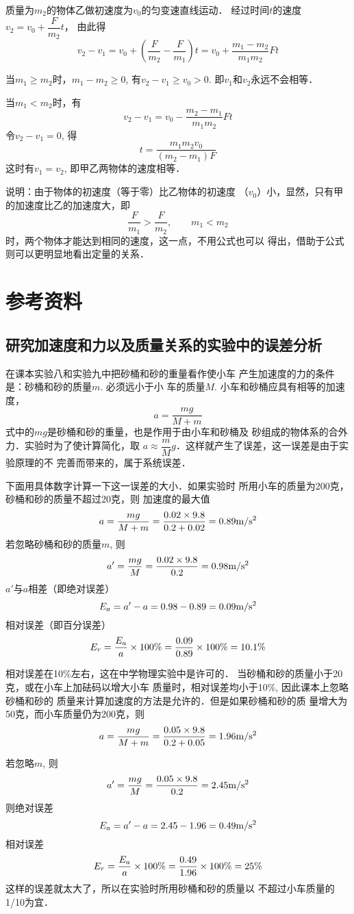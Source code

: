 \begin{enumerate}
\begin{solution}
质量为$m_2$的物体乙做初速度为$v_0$的匀变速直线运动．
经过时间$t$的速度$v_2=v_0+\dfrac{F}{m_2}t$，
由此得
\[v_2-v_1=v_0+\left(\dfrac{F}{m_2}-\dfrac{F}{m_1}\right)t=v_0+\frac{m_1-m_2}{m_1m_2}Ft\]

当$m_1\ge m_2$时，$m_1-m_2\ge 0$, 有$v_2-v_1\ge v_0>0$. 即$v_1$和$v_2$永远不会相等．

当$m_1<m_2$时，有
\[v_2-v_1=v_0-\frac{m_2-m_1}{m_1m_2}Ft\]
令$v_2-v_1=0$, 得
\[t=\frac{m_1m_2v_0}{(m_2-m_1)F}\]
这时有$v_1=v_2$, 即甲乙两物体的速度相等．

说明：由于物体的初速度（等于零）比乙物体的初速度
（$v_0$）小，显然，只有甲的加速度比乙的加速度大，即
\[\frac{F}{m_1}>\frac{F}{m_2},\qquad m_1<m_2\]
时，两个物体才能达到相同的速度，这一点，不用公式也可以
得出，借助于公式则可以更明显地看出定量的关系．
\end{solution}
\end{enumerate}

\section{参考资料}
\subsection{研究加速度和力以及质量关系的实验中的误差分析}

在课本实验八和实验九中把砂桶和砂的重量看作使小车
产生加速度的力的条件是：砂桶和砂的质量$m$. 必须远小于小
车的质量$M$. 小车和砂桶应具有相等的加速度，
\[a=\frac{mg}{M+m}\]
式中的$mg$是砂桶和砂的重量，也是作用于由小车和砂桶及
砂组成的物体系的合外力．实验时为了使计算简化，取
$a\approx \dfrac{m}{M}g$．这样就产生了误差，这一误差是由于实验原理的不
完善而带来的，属于系统误差．

下面用具体数字计算一下这一误差的大小．如果实验时
所用小车的质量为200克，砂桶和砂的质量不超过20克，则
加速度的最大值
\[a=\frac{mg}{M+m}=\frac{0.02\times 9.8}{0.2+0.02}=0.89\text{m}/\text{s}^2\]
若忽略砂桶和砂的质量$m$, 则
\[a'=\frac{mg}{M}=\frac{0.02\times 9.8}{0.2}=0.98\text{m}/\text{s}^2\]
$a'$与$a$相差（即绝对误差）
\[E_a=a'-a=0.98-0.89=0.09\text{m}/\text{s}^2\]
相对误差（即百分误差）
\[E_r=\frac{E_a}{a}\times 100\%=\frac{0.09}{0.89}\times 100\%=10.1\%\]

相对误差在10\%左右，这在中学物理实验中是许可的．
当砂桶和砂的质量小于20克，或在小车上加砝码以增大小车
质量时，相对误差均小于10\%, 因此课本上忽略砂桶和砂的
质量来计算加速度的方法是允许的．但是如果砂桶和砂的质
量增大为50克，而小车质量仍为200克，则
\[a=\frac{mg}{M+m}=\frac{0.05\times 9.8}{0.2+0.05}=1.96\text{m}/\text{s}^2\]

若忽略$m$, 则
\[a'=\frac{mg}{M}=\frac{0.05\times 9.8}{0.2}=2.45\text{m}/\text{s}^2\]
则绝对误差
\[E_a=a'-a=2.45-1.96=0.49\text{m}/\text{s}^2\]
相对误差
\[E_r=\frac{E_a}{a}\times 100\%=\frac{0.49}{1.96}\times 100\%=25\%\]
这样的误差就太大了，所以在实验时所用砂桶和砂的质量以
不超过小车质量的1/10为宜．

